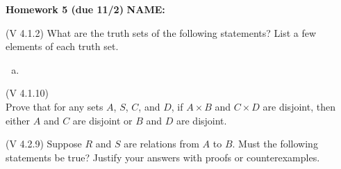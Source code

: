 \documentclass[fleqn,addpoints,12pt]{exam}
\newif\ifanswers
\theoremstyle{remark}
\newcommand{\N}{\ensuremath{\mathbb N}}
\begin{document}
\hfill {\bf Homework 5 (due 11/2)} 
\hfill  \ifanswers {\bf ANSWERS} \else {\bf NAME:}\phantom{XXXXXXXXXXXXX} \fi 

  \renewcommand{\bigskip}{\vskip1cm}

\pagestyle{foot}

\begin{questions} %

  
  \question[2] (V 4.1.2) 
  What are the truth sets of the following statements? List a few elements
  of each truth set.

  \medskip
  \begin{solution}
    \begin{enumerate}[(a)]
    \item 
    \end{enumerate}
  \end{solution}

  \ifanswers \vskip1cm \else \vskip30mm \fi

  \question[2] (V 4.1.10)\\[4pt]
  Prove that for any sets $A$, $S$, $C$, and $D$, if $A \times B$ and $C \times D$ are disjoint,
  then either $A$ and $C$ are disjoint or $B$ and $D$ are disjoint.
  \medskip
  \begin{solution}
  \end{solution}

  \ifanswers \vskip1cm \else \newpage \fi

  \question[3] (V 4.2.9)
  Suppose $R$ and $S$ are relations from $A$ to $B$. Must the following statements
  be true? Justify your answers with proofs or counterexamples.
  \begin{parts}  

\end{parts}
\end{questions}
\end{document}
